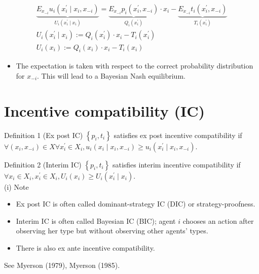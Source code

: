 \documentclass[10pt]{article}
\begin{document}
$$
\begin{gathered}
\underbrace{E_{x_{-i}} u_{i}\left(x_{i}^{\prime} \mid x_{i}, x_{-i}\right)}_{U_{i}\left(x_{i}^{\prime} \mid x_{i}\right)}=\underbrace{E_{x_{-i}} p_{i}\left(x_{i}^{\prime}, x_{-i}\right)}_{Q_{i}\left(x_{i}^{\prime}\right)} \cdot x_{i}-\underbrace{E_{x_{-i}} t_{i}\left(x_{i}^{\prime}, x_{-i}\right)}_{T_{i}\left(x_{i}^{\prime}\right)} \\
U_{i}\left(x_{i}^{\prime} \mid x_{i}\right):=Q_{i}\left(x_{i}^{\prime}\right) \cdot x_{i}-T_{i}\left(x_{i}^{\prime}\right) \\
U_{i}\left(x_{i}\right):=Q_{i}\left(x_{i}\right) \cdot x_{i}-T_{i}\left(x_{i}\right)
\end{gathered}
$$

\begin{itemize}
  \item The expectation is taken with respect to the correct probability distribution for $x_{-i}$. This will lead to a Bayesian Nash equilibrium.
\end{itemize}

\section*{Incentive compatibility (IC)}
Definition 1 (Ex post IC) $\left\{p_{i}, t_{i}\right\}$ satisfies ex post incentive compatibility if $\forall\left(x_{i}, x_{-i}\right) \in X \forall x_{i}^{\prime} \in X_{i}, u_{i}\left(x_{i} \mid x_{i}, x_{-i}\right) \geq u_{i}\left(x_{i}^{\prime} \mid x_{i}, x_{-i}\right)$.

Definition 2 (Interim IC) $\left\{p_{i}, t_{i}\right\}$ satisfies interim incentive compatibility if $\forall x_{i} \in X_{i}, x_{i}^{\prime} \in X_{i}, U_{i}\left(x_{i}\right) \geq U_{i}\left(x_{i}^{\prime} \mid x_{i}\right)$.\\
(i) Note

\begin{itemize}
  \item Ex post IC is often called dominant-strategy IC (DIC) or strategy-proofness.
  \item Interim IC is often called Bayesian IC (BIC); agent $i$ chooses an action after observing her type but without observing other agents' types.
  \item There is also ex ante incentive compatibility.
\end{itemize}

See Myerson (1979), Myerson (1985).
\end{document}
